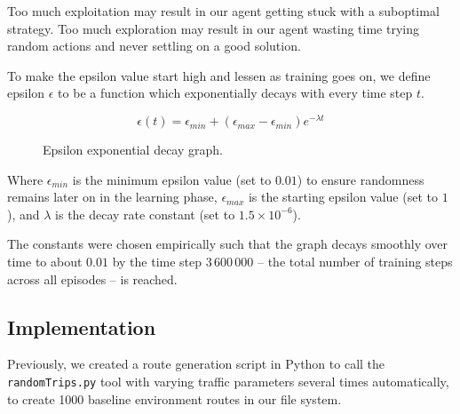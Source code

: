 \documentclass[a4paper]{report}
\begin{document}
Too much exploitation may result in our agent getting stuck with a suboptimal strategy. Too much exploration may result in our agent wasting time trying random actions and never settling on a good solution.

To make the epsilon value start high and lessen as training goes on, we define epsilon $\epsilon$ to be a function which exponentially decays with every time step $t$.

\[
  \epsilon(t) = \epsilon_{min} + (\epsilon_{max}-\epsilon_{min}) e^{-\lambda t} 
\]


\begin{figure}[H]
  \centering
  \caption{Epsilon exponential decay graph.}
  \label{fig:epsilon_decay}
\end{figure}

Where $\epsilon_{min}$ is the minimum epsilon value (set to $0.01$) to ensure randomness remains later on in the learning phase, $\epsilon_{max}$ is the starting epsilon value (set to $1$), and $\lambda$ is the decay rate constant (set to $1.5\times10^{-6}$).

The constants were chosen empirically\footnotemark{} such that the graph decays smoothly over time to about $0.01$ by the time step $3\,600\,000$ -- the total number of training steps across all episodes -- is reached.

\subsection{Implementation}

Previously, we created a route generation script in Python to call the \texttt{randomTrips.py} tool with varying traffic parameters several times automatically, to create 1000 baseline environment routes in our file system.
\end{document}
